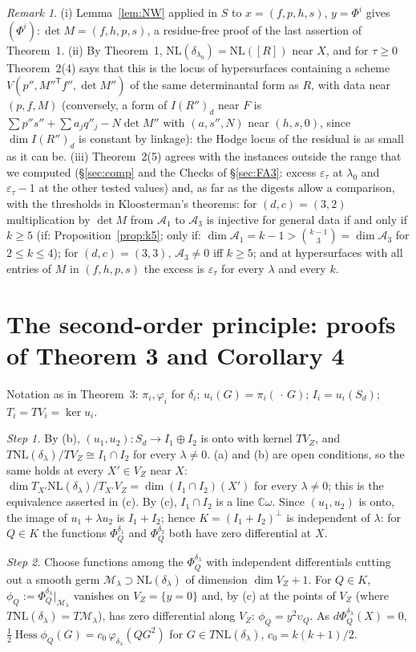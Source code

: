 \documentclass[11pt]{article}
\numberwithin{equation}{section}
\theoremstyle{remark}
\newtheorem{remark}[theorem]{Remark}
\newcommand{\CC}{\mathbb{C}}
\newcommand{\NL}{\mathrm{NL}}
\newcommand{\VZ}{V_Z}
\newcommand{\cM}{\mathcal{M}}
\newcommand{\cA}{\mathcal{A}}
\newcommand{\Hess}{\operatorname{Hess}}
\newcommand{\T}{\mathsf{T}}
\newcommand{\lz}{\lambda_0}
\newcommand{\et}{\varepsilon_\tau}
\begin{document}
\begin{remark}
(i) Lemma~\ref{lem:NW} applied in $S$ to $x=(f,p,h,s)$, $y=\Phi^i$ gives $(\Phi^i):\det M=(f,h,p,s)$, a
residue-free proof of the last assertion of Theorem~1. (ii) By Theorem~1, $\NL(\delta_{\lz})=\NL([R])$ near $X$,
and for $\tau\ge0$ Theorem~2(4) says that this is the locus of hypersurfaces containing a scheme
$V(p'',M''^\T f'',\det M'')$ of the same determinantal form as $R$, with data near $(p,f,M)$ (conversely, a form
of $I(R'')_d$ near $F$ is $\sum p''s''+\sum a_jq''_j-N\det M''$ with $(a,s'',N)$ near $(h,s,0)$, since $\dim I(R'')_d$
is constant by linkage): the Hodge locus of the residual is as small as it can be. (iii) Theorem~2(5) agrees with the instances outside the range that we
computed (\S\ref{sec:comp} and the Checks of \S\ref{sec:FA3}: excess $\et$ at $\lz$ and $\et-1$ at the other tested values) and, as far as the
digests allow a comparison, with the thresholds in Kloosterman's theorems: for $(d,c)=(3,2)$ multiplication by
$\det M$ from $\cA_1$ to $\cA_3$ is injective for general data if and only if $k\ge5$ (if: Proposition~\ref{prop:k5}; only if:
$\dim\cA_1=k-1>\binom{k-1}3=\dim\cA_3$ for $2\le k\le4$); for $(d,c)=(3,3)$, $\cA_3\ne0$ iff $k\ge5$; and at
hypersurfaces with all entries of $M$ in $(f,h,p,s)$ the excess is $\et$ for every $\lambda$ and every $k$.
\end{remark}

\section{The second-order principle: proofs of Theorem 3 and Corollary 4}\label{sec:G}

Notation as in Theorem~3: $\pi_i,\varphi_i$ for $\delta_i$; $u_i(G)=\pi_i(\,\cdot\,G)$; $I_i=u_i(S_d)$;
$T_i=TV_i=\ker u_i$.

\emph{Step 1.} By (b), $(u_1,u_2):S_d\to I_1\oplus I_2$ is onto with kernel $T\VZ$, and
$T\NL(\delta_\lambda)/T\VZ\cong I_1\cap I_2$ for every $\lambda\ne0$. (a) and (b) are open conditions, so the same
holds at every $X'\in\VZ$ near $X$: $\dim T_{X'}\NL(\delta_\lambda)/T_{X'}\VZ=\dim(I_1\cap I_2)(X')$ for every
$\lambda\ne0$; this is the equivalence asserted in (c). By (c), $I_1\cap I_2$ is a line $\CC\omega$. Since
$(u_1,u_2)$ is onto, the image of $u_1+\lambda u_2$ is $I_1+I_2$; hence $K=(I_1+I_2)^\perp$ is independent of
$\lambda$: for $Q\in K$ the functions $\Phi^{\delta_1}_Q$ and $\Phi^{\delta_2}_Q$ both have zero differential at
$X$.

\emph{Step 2.} Choose functions among the $\Phi^{\delta_\lambda}_Q$ with independent differentials cutting out a
smooth germ $\cM_\lambda\supset\NL(\delta_\lambda)$ of dimension $\dim\VZ+1$. For $Q\in K$,
$\phi_Q:=\Phi^{\delta_\lambda}_Q|_{\cM_\lambda}$ vanishes on $\VZ=\{y=0\}$ and, by (c) at the points of $\VZ$
(where $T\NL(\delta_\lambda)=T\cM_\lambda$), has zero differential along $\VZ$: $\phi_Q=y^2\upsilon_Q$. As
$d\Phi^{\delta_\lambda}_Q(X)=0$, $\tfrac12\Hess\phi_Q(G)=c_0\,\varphi_{\delta_\lambda}(QG^2)$ for
$G\in T\NL(\delta_\lambda)$, $c_0=k(k+1)/2$.
\end{document}
